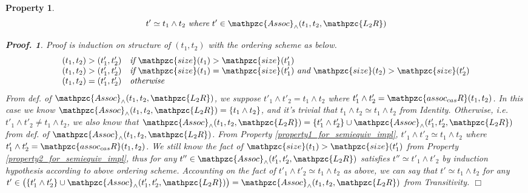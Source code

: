 \documentclass[12pt]{article}
\newtheorem{Property}{Property}[section]
\newtheorem{Proof}{Proof.}
\begin{document}
\begin{Property}
  \label{property5_for_semiequiv_impl}
  \[ t' \simeq t_1 \wedge t_2\ \text{\it where}\
      t' \in \mathpzc{Assoc}_\wedge(t_1, t_2, \mathpzc{L_2R})
  \]
  \begin{Proof}
    Proof is induction on structure of $(t_1, t_2)$ with the ordering
    scheme as below.
    \[ \begin{array}{l}
         (t_1, t_2) > (t'_1, t'_2) \quad
          \text{\it if}\ \mathpzc{size}(t_1) > \mathpzc{size}(t'_1)  \\
         (t_1, t_2) > (t'_1, t'_2) \quad
          \text{\it if}\ \mathpzc{size}(t_1) = \mathpzc{size}(t'_1)\
           \text{\it and}\ \mathpzc{size}(t_2) > \mathpzc{size}(t'_2)  \\
         (t_1, t_2) = (t'_1, t'_2) \quad \text{\it otherwise}
       \end{array}
    \]
    From def. of $\mathpzc{Assoc}_\wedge(t_1, t_2, \mathpzc{L_2R})$,
    we suppose $t'_1 \wedge t'_2 = t_1 \wedge t_2$ where
    $t'_1 \wedge t'_2 = \mathpzc{assoc_{cas}R}(t_1, t_2)$.
    In this case we know $\mathpzc{Assoc}_\wedge(t_1, t_2, \mathpzc{L_2R})
    = \{t_1 \wedge t_2\}$, and it's trivial that
    $t_1 \wedge t_2 \simeq t_1 \wedge t_2$ from Identity.
    Otherwise, i.e. $t'_1 \wedge t'_2 \neq t_1 \wedge t_2$, we also know
    that $\mathpzc{Assoc}_\wedge(t_1, t_2, \mathpzc{L_2R}) =
    \{t'_1 \wedge t'_2\} \cup \mathpzc{Assoc}_\wedge(t'_1, t'_2,
    \mathpzc{L_2R})$ from def. of
    $\mathpzc{Assoc}_\wedge(t_1, t_2, \mathpzc{L_2R})$. From Property
    \ref{property1_for_semiequiv_impl},
    $t'_1 \wedge t'_2 \simeq t_1 \wedge t_2$ where
    $t'_1 \wedge t'_2 = \mathpzc{assoc_{cas}R}(t_1, t_2)$. We still know
    the fact of $\mathpzc{size}(t_1) > \mathpzc{size}(t'_1)$ from Property
    \ref{property2_for_semiequiv_impl}, thus for any
    $t'' \in \mathpzc{Assoc}_\wedge(t'_1, t'_2, \mathpzc{L_2R})$ satisfies
    $t'' \simeq t'_1 \wedge t'_2$ by induction hypothesis according to
    above ordering scheme.
    Accounting on the fact of $t'_1 \wedge t'_2 \simeq t_1 \wedge t_2$ as
    above, we can say that $t' \simeq t_1 \wedge t_2$ for any
    $t' \in \bigl(\{t'_1 \wedge t'_2\} \cup
    \mathpzc{Assoc}_\wedge(t'_1, t'_2, \mathpzc{L_2R}) \bigr) =
    \mathpzc{Assoc}_\wedge(t_1, t_2, \mathpzc{L_2R})$ from Transitivity.
    $\Box$
  \end{Proof}
\end{Property}
\end{document}
